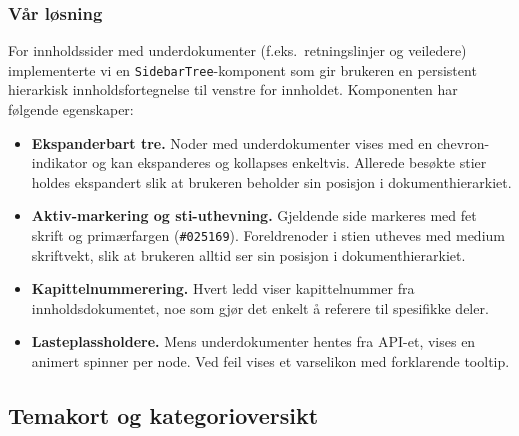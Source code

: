 \subsubsection{Vår løsning}
\label{sec:sidenavigasjon-var}


For innholdssider med underdokumenter (f.eks.\ retningslinjer og
veiledere) implementerte vi en \texttt{SidebarTree}-komponent som gir
brukeren en persistent hierarkisk innholdsfortegnelse til venstre for
innholdet. Komponenten har følgende egenskaper:

\begin{itemize}
    \item \textbf{Ekspanderbart tre.} Noder med underdokumenter vises med
          en chevron-indikator og kan ekspanderes og kollapses enkeltvis.
          Allerede besøkte stier holdes ekspandert slik at brukeren
          beholder sin posisjon i dokumenthierarkiet.

    \item \textbf{Aktiv-markering og sti-uthevning.} Gjeldende side
          markeres med fet skrift og primærfargen (\texttt{\#025169}).
          Foreldrenoder i stien utheves med medium skriftvekt, slik at
          brukeren alltid ser sin posisjon i dokumenthierarkiet.

    \item \textbf{Kapittelnummerering.} Hvert ledd viser kapittelnummer
          fra innholdsdokumentet, noe som gjør det enkelt å referere til
          spesifikke deler.

    \item \textbf{Lasteplassholdere.} Mens underdokumenter hentes fra
          API-et, vises en animert spinner per node. Ved feil vises et
          varselikon med forklarende tooltip.
\end{itemize}

\subsection{Temakort og kategorioversikt}
\label{sec:temakort}

